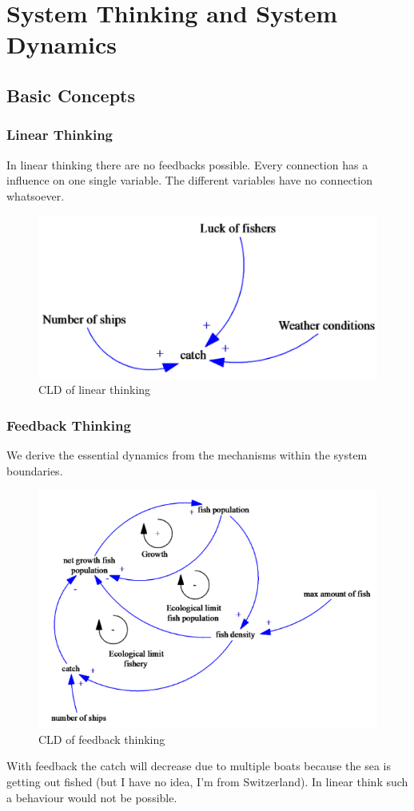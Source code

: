 \section{System Thinking and System Dynamics}

\subsection{Basic Concepts}

\subsubsection{Linear Thinking}
In linear thinking there are no feedbacks possible. Every connection
has a influence on one single variable. The different variables have no
connection whatsoever.

\begin{figure}[H]
	\centering
	\includegraphics[width=.4\textwidth]{figures/linearThinking.png}
	\caption{CLD of linear thinking}
\end{figure}

\subsubsection{Feedback Thinking}

We derive the essential dynamics from the mechanisms within the system
boundaries.

\begin{figure}[H]
	\centering
	\includegraphics[width=.4\textwidth]{figures/feedbackThinking.png}
	\caption{CLD of feedback thinking}
\end{figure}

With feedback the catch will decrease due to multiple boats because the
sea is getting out fished (but I have no idea, I'm from Switzerland). In
linear think such a behaviour would not be possible.

